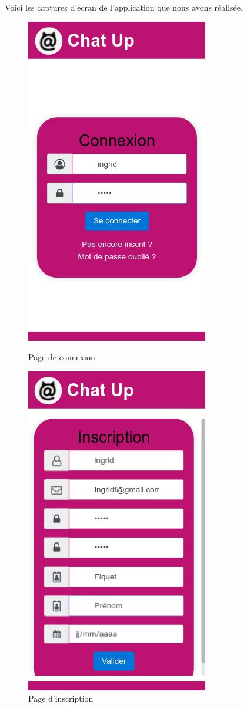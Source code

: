 Voici les captures d'écran de l'application que nous avons réalisée.



\begin{figure}[H]
   \begin{minipage}[c]{.46\linewidth}
      \includegraphics[scale=0.5]{img/01Login.png}
      \caption{Page de connexion}
   \end{minipage} \hfill
   \begin{minipage}[c]{.46\linewidth}
      \includegraphics[scale=0.5]{img/02InscriptionChamp.png}
      \caption{Page d'inscription}
   \end{minipage}
\end{figure}


